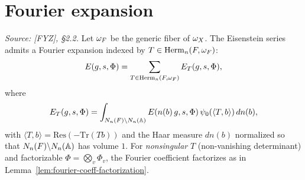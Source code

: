 \section{Fourier expansion}

\begin{definition}
  \label{def:fourier-coefficient}
  \textit{Source: [FYZ], \S2.2.}
  Let \(\omega_F\) be the generic fiber of \(\omega_X\). The Eisenstein series admits a
  Fourier expansion indexed by \(T \in \operatorname{Herm}_n(F, \omega_F)\):
  \[
    E(g, s, \Phi) = \sum_{T \in \operatorname{Herm}_n(F, \omega_F)} E_T(g, s, \Phi),
  \]
  where
  \[
    E_T(g, s, \Phi) = \int_{N_n(F) \backslash N_n(\mathbb{A})}
      E(n(b)\, g, s, \Phi)\, \psi_0(\langle T, b \rangle)\, dn(b),
  \]
  with \(\langle T, b \rangle = \mathrm{Res}(-\mathrm{Tr}(Tb))\) and the Haar measure
  \(dn(b)\) normalized so that \(N_n(F) \backslash N_n(\mathbb{A})\) has volume \(1\). For
  \emph{nonsingular} \(T\) (non-vanishing determinant) and factorizable
  \(\Phi = \bigotimes_v \Phi_v\), the Fourier coefficient factorizes as in
  Lemma~\ref{lem:fourier-coeff-factorization}.
\end{definition}


